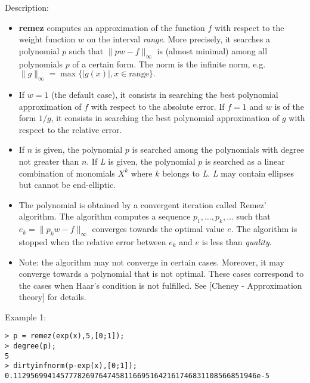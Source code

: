 \noindent Description: \begin{itemize}

\item \textbf{remez} computes an approximation of the function $f$ with respect to 
   the weight function $w$ on the interval \emph{range}. More precisely, it 
   searches a polynomial $p$ such that $\|pw-f\|_{\infty}$ is 
   (almost minimal) among all polynomials $p$ of a certain form. The norm is
   the infinite norm, e.g. $\|g\|_{\infty} = \max \{|g(x)|, x \in \mathrm{range}\}.$

\item If $w=1$ (the default case), it consists in searching the best 
   polynomial approximation of $f$ with respect to the absolute error.
   If $f=1$ and $w$ is of the form $1/g$, it consists in 
   searching the best polynomial approximation of $g$ with respect to the 
   relative error.

\item If $n$ is given, the polynomial $p$ is searched among the 
   polynomials with degree not greater than $n$.
   If \emph{L} is given, the polynomial $p$ is searched as a linear combination 
   of monomials $X^k$ where $k$ belongs to \emph{L}.
   \emph{L} may contain ellipses but cannot be end-elliptic.

\item The polynomial is obtained by a convergent iteration called Remez' algorithm. 
   The algorithm computes a sequence $p_1,\dots ,p_k,\dots$ 
   such that $e_k = \|p_k w-f\|_{\infty}$ converges towards 
   the optimal value $e$. The algorithm is stopped when the relative error 
   between $e_k$ and $e$ is less than \emph{quality}.

\item Note: the algorithm may not converge in certain cases. Moreover, it may 
   converge towards a polynomial that is not optimal. These cases correspond to 
   the cases when Haar's condition is not fulfilled.
   See [Cheney - Approximation theory] for details.
\end{itemize}
\noindent Example 1: 
\begin{center}\begin{minipage}{15cm}\begin{Verbatim}[frame=single]
> p = remez(exp(x),5,[0;1]);
> degree(p);
5
> dirtyinfnorm(p-exp(x),[0;1]);
0.112956994145777826976474581166951642161746831108566851946e-5
\end{Verbatim}
\end{minipage}\end{center}
